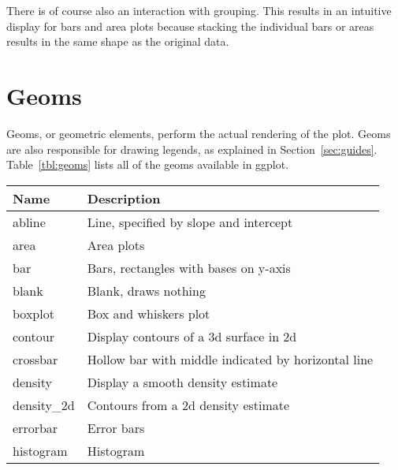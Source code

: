 There is of course also an interaction with grouping.  This results in an intuitive display for bars and area plots because stacking the individual bars or areas results in the same shape as the original data.


\section{Geoms}
\label{sec:geom}

Geoms, or geometric elements, perform the actual rendering of the plot. Geoms are also responsible for drawing legends, as explained in Section~\ref{sec:guides}.  Table~\ref{tbl:geoms} lists all of the geoms available in ggplot.  

\begin{table}
  \begin{center}
  \begin{tabular}{lp{3in}}
      \toprule
      Name & Description \\
      \midrule
      abline       & Line, specified by slope and intercept                                       \\
      area         & Area plots                                                                   \\
      bar          & Bars, rectangles with bases on y-axis                                        \\
      blank        & Blank, draws nothing                                                         \\
      boxplot      & Box and whiskers plot                                                        \\
      contour      & Display contours of a 3d surface in 2d                                       \\
      crossbar     & Hollow bar with middle indicated by horizontal line                          \\
      density      & Display a smooth density estimate                                            \\
      density\_2d & Contours from a 2d density estimate                                          \\
      errorbar     & Error bars                                                                   \\
      histogram    & Histogram                                                                    \\

\end{tabular}
\end{center}
\end{table}
